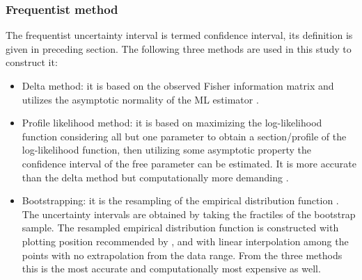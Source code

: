\subsubsection*{Frequentist method}
The frequentist uncertainty interval is termed confidence interval, its definition is given in preceding section. The following three methods are used in this study to construct it:
\begin{itemize}
	\item Delta method: it is based on the observed Fisher information matrix and utilizes the asymptotic normality of the ML estimator \citep{Coles2001, Dorfman1938}.
	\item Profile likelihood method: it is based on maximizing the log-likelihood function considering all but one parameter to obtain a section/profile of the log-likelihood function, then utilizing some asymptotic property the confidence interval of the free parameter can be estimated. It is more accurate than the delta method but computationally more demanding \citep{Box1964, Coles2001}.
	\item Bootstrapping: it is the resampling of the empirical distribution function \citep{Efron1979, Efron1994}. The uncertainty intervals are obtained by taking the fractiles of the bootstrap sample. The resampled empirical distribution function is constructed with plotting position recommended by \citet{Cunnane1978}, and with linear interpolation among the points with no extrapolation from the data range. From the three methods this is the most accurate and computationally most expensive as well.
\end{itemize}

